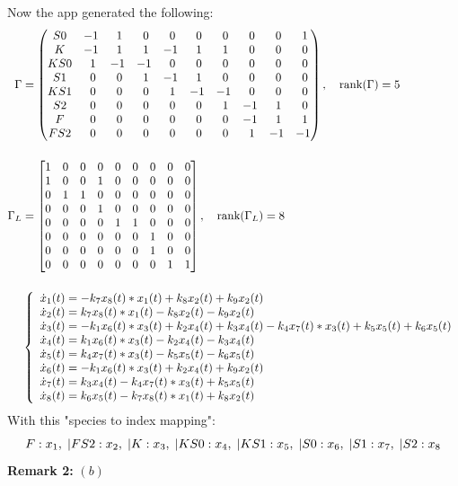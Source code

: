 Now the app generated the following:
\begin{align*}
	\Gamma &=
	\begin{pmatrix}
		S0& -1&\ 1&\ 0&\ 0&\ 0&\ 0&\ 0&\ 0&\ 1\cr K& -1&\ 1&\ 1& -1&\ 1&\ 1&\ 0&\ 0&\ 0\cr KS0&\ 1& -1& -1&\ 0&\ 0&\ 0&\ 0&\ 0&\ 0\cr S1&\ 0&\ 0&\ 1& -1&\ 1&\ 0&\ 0&\ 0&\ 0\cr KS1&\ 0&\ 0&\ 0&\ 1& -1& -1&\ 0&\ 0&\ 0\cr S2&\ 0&\ 0&\ 0&\ 0&\ 0&\ 1& -1&\ 1&\ 0\cr F&\ 0&\ 0&\ 0&\ 0&\ 0&\ 0& -1&\ 1&\ 1\cr FS2&\ 0&\ 0&\ 0&\ 0&\ 0&\ 0&\ 1& -1& -1\cr
	\end{pmatrix}, \quad \text{rank}(\Gamma) = 5 \\[3ex]
	\Gamma_L &=
	\begin{bmatrix}
		1 & 0 & 0& 0& 0& 0& 0& 0& 0 \\
		1 & 0 & 0& 1& 0& 0& 0& 0& 0 \\
		0 & 1 & 1& 0& 0& 0& 0& 0& 0 \\
		0 & 0 & 0& 1& 0& 0& 0& 0& 0 \\
		0 & 0 & 0& 0& 1& 1& 0& 0& 0 \\
		0 & 0 & 0& 0& 0& 0& 1& 0& 0 \\
		0 & 0 & 0& 0& 0& 0& 1& 0& 0 \\
		0 & 0 & 0& 0& 0& 0& 0& 1& 1 \\
	\end{bmatrix}, \quad \text{rank}(\Gamma_L) = 8 \\[3ex]
	&
	\begin{cases*}
		\begin{array}{ll}
			\dot{x}_1(t) = -k_7 x_8(t) *x_1(t)+k_8 x_2(t)+k_9 x_2(t) \\
			\dot{x}_2(t) = k_7 x_8(t) *x_1(t)-k_8 x_2(t)-k_9 x_2(t) \\
			\dot{x}_3(t) = -k_1 x_6(t) *x_3(t)+k_2 x_4(t)+k_3 x_4(t)-k_4 x_7(t) *x_3(t)+k_5 x_5(t)+k_6 x_5(t) \\
			\dot{x}_4(t) = k_1 x_6(t) *x_3(t)-k_2 x_4(t)-k_3 x_4(t) \\
			\dot{x}_5(t) = k_4 x_7(t) *x_3(t)-k_5 x_5(t)-k_6 x_5(t) \\
			\dot{x}_6(t) = -k_1 x_6(t) *x_3(t)+k_2 x_4(t)+k_9 x_2(t) \\
			\dot{x}_7(t) = k_3 x_4(t)-k_4 x_7(t) *x_3(t)+k_5 x_5(t) \\
			\dot{x}_8(t) = k_6 x_5(t)-k_7 x_8(t) *x_1(t)+k_8 x_2(t) \\
		\end{array}	
	\end{cases*}
\end{align*}
With this "species to index mapping":
\[
	F: x_1, \hspace{1mm}
	| FS2: x_2, \hspace{1mm}
	| K: x_3, \hspace{1mm}
	| KS0: x_4, \hspace{1mm}
	| KS1: x_5, \hspace{1mm}
	| S0: x_6, \hspace{1mm}
	| S1: x_7, \hspace{1mm}
	| S2: x_8
\]
\textbf{Remark 2:} $(b)$

